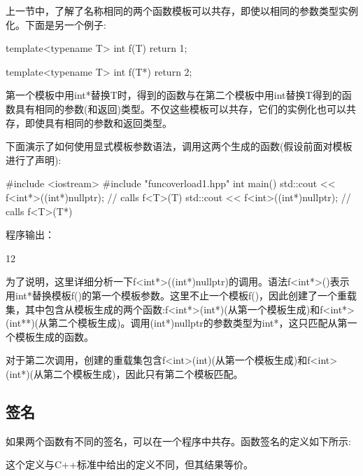 

上一节中，了解了名称相同的两个函数模板可以共存，即使以相同的参数类型实例化。下面是另一个例子:

\begin{cpp}
template<typename T>
int f(T)
{
	return 1;
}

template<typename T>
int f(T*)
{
	return 2;
}
\end{cpp}

第一个模板中用int*替换T时，得到的函数与在第二个模板中用int替换T得到的函数具有相同的参数(和返回)类型。不仅这些模板可以共存，它们的实例化也可以共存，即使具有相同的参数和返回类型。

下面演示了如何使用显式模板参数语法，调用这两个生成的函数(假设前面对模板进行了声明):

\begin{cpp}
#include <iostream>
#include "funcoverload1.hpp"
int main()
{
	std::cout << f<int*>((int*)nullptr); // calls f<T>(T)
	std::cout << f<int>((int*)nullptr); // calls f<T>(T*)
}
\end{cpp}

程序输出：

\begin{shell}
12
\end{shell}

为了说明，这里详细分析一下f<int*>((int*)nullptr)的调用。语法f<int*>()表示用int*替换模板f()的第一个模板参数。这里不止一个模板f()，因此创建了一个重载集，其中包含从模板生成的两个函数:f<int*>(int*)(从第一个模板生成)和f<int*>(int**)(从第二个模板生成)。调用(int*)nullptr的参数类型为int*，这只匹配从第一个模板生成的函数。

对于第二次调用，创建的重载集包含f<int>(int)(从第一个模板生成)和f<int>(int*)(从第二个模板生成)，因此只有第二个模板匹配。

\subsection{签名}

如果两个函数有不同的签名，可以在一个程序中共存。函数签名的定义如下所示:

\begin{notice}这个定义与C++标准中给出的定义不同，但其结果等价。
\end{notice}

